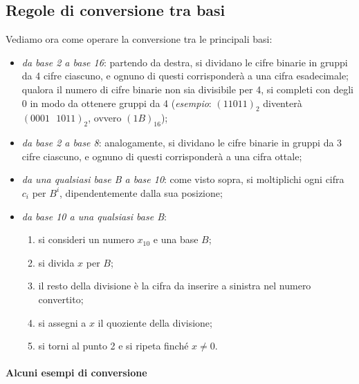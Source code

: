 \documentclass[class=book, crop=false, oneside]{standalone}
\begin{document}
\subsection{Regole di conversione tra basi}
Vediamo ora come operare la conversione tra le principali basi:
\begin{itemize}
	\item \emph{da base 2 a base 16}: partendo da destra, si dividano le cifre binarie in gruppi da 4 cifre ciascuno, e ognuno di questi corrisponderà a una cifra esadecimale; qualora il numero di cifre binarie non sia divisibile per 4, si completi con degli 0 in modo da ottenere gruppi da 4 (\emph{esempio}: \((11011)_{2}\) diventerà \((0001\text{ }1011)_{2}\), ovvero \((1B)_{16}\));
	\item \emph{da base 2 a base 8}: analogamente, si dividano le cifre binarie in gruppi da 3 cifre ciascuno, e ognuno di questi corrisponderà a una cifra ottale;
	\item \emph{da una qualsiasi base B a base 10}: come visto sopra, si moltiplichi ogni cifra $c_{i}$ per $B^{i}$, dipendentemente dalla sua posizione;
	\item \emph{da base 10 a una qualsiasi base B}:
	\begin{enumerate}
		\item si consideri un numero \(x_{10}\) e una base \(B\);
		\item si divida \(x\) per \(B\);
		\item il resto della divisione è la cifra da inserire a sinistra nel numero convertito;
		\item si assegni a \(x\) il quoziente della divisione;
		\item si torni al punto 2 e si ripeta finché \(x\neq0\).
	\end{enumerate}
\end{itemize}
\paragraph*{Alcuni esempi di conversione}
\end{document}
